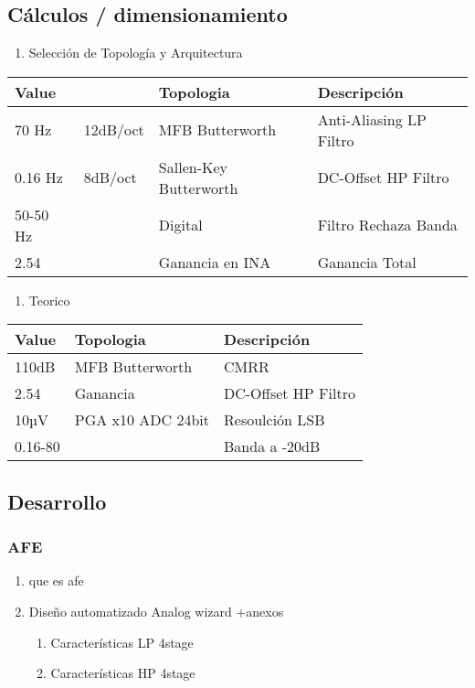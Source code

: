 \documentclass[11pt]{article}
\begin{document}
\subsection{Cálculos / dimensionamiento}
\label{sec:orgb962e6e}
\begin{enumerate}
\item Selección de Topología y Arquitectura\\
\end{enumerate}
\begin{center}
\begin{tabular}{llll}
Value &  & Topologia & Descripción\\
\hline
70 Hz & 12dB/oct & MFB Butterworth & Anti-Aliasing LP Filtro\\
0.16 Hz & 8dB/oct & Sallen-Key Butterworth & DC-Offset HP Filtro\\
50-50 Hz &  & Digital & Filtro Rechaza Banda\\
2.54 &  & Ganancia en INA & Ganancia Total\\
\end{tabular}
\end{center}

\begin{enumerate}
\item Teorico\\
\end{enumerate}
\begin{center}
\begin{tabular}{lll}
Value & Topologia & Descripción\\
\hline
110dB & MFB Butterworth & CMRR\\
2.54 & Ganancia & DC-Offset HP Filtro\\
10µV & PGA x10 ADC 24bit & Resoulción LSB\\
0.16-80 &  & Banda a -20dB\\
\end{tabular}
\end{center}

\subsection{Desarrollo}
\label{sec:orgea9450c}
\subsubsection{AFE}
\label{sec:orgcbf996f}
\begin{enumerate}
\item que es afe\\
\item Diseño automatizado Analog wizard +anexos\\
\begin{enumerate}
\item Características LP 4stage\\
\item Características HP 4stage\\
\end{enumerate}
\end{enumerate}
\end{document}
